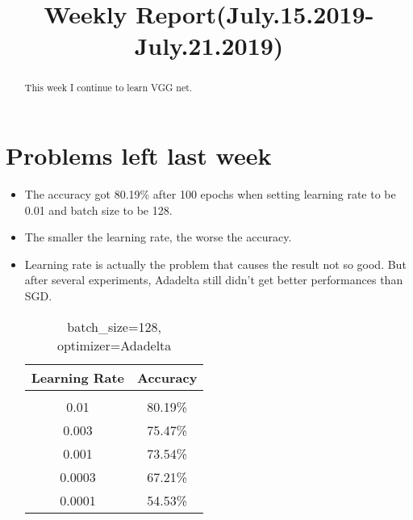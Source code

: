 \documentclass{article} %
\title{Weekly Report(July.15.2019-July.21.2019)}
\begin{document}
\maketitle

\begin{abstract}
This week I continue to learn VGG net.
  
\end{abstract}

\section{Problems left last week}

\begin{itemize}
\item The accuracy got 80.19\% after 100 epochs when setting learning rate to be 0.01 and batch size to be 128.
\item The smaller the learning rate, the worse the accuracy.
\item Learning rate is actually the problem that causes the result not so good. But after several experiments, Adadelta still didn't get better performances than SGD.

\begin{table}[h]
\caption{batch\_size=128, optimizer=Adadelta}
\begin{center}
\begin{tabular}{c|c}
\multicolumn{1}{c}{\bf Learning Rate} &\multicolumn{1}{c}{\bf Accuracy}
\\ \hline \\
0.01 & 80.19\% \\
0.003 & 75.47\% \\
0.001 & 73.54\% \\
0.0003 & 67.21\% \\
0.0001 &  54.53\% \\
\end{tabular}
\end{center}
\end{table}

\end{itemize}
\end{document}
